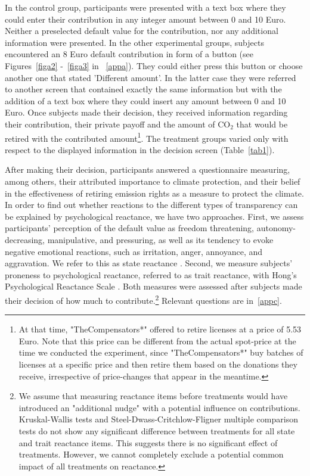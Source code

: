 \documentclass[review, authoryear,12pt]{elsarticle}
\begin{document}
In the control group, participants were presented with a text box where they could enter their contribution in any integer amount between 0 and 10 Euro. Neither a preselected default value for the contribution, nor any additional information were presented. In the other experimental groups, subjects encountered an 8 Euro default contribution in form of a button (see Figures~\ref{figa2} -~\ref{figa3} in ~\ref{appa}). They could either press this button or choose another one that stated 'Different amount'. In the latter case they were referred to another screen that contained exactly the same information but with the addition of a text box where they could insert any amount between 0 and 10 Euro. Once subjects made their decision, they received information regarding their contribution, their private payoff and the amount of CO$_2$ that would be retired with the contributed amount\footnote{At that time, "TheCompensators*" offered to retire licenses at a price of 5.53 Euro. Note that this price can be different from the actual spot-price at the time we conducted the experiment, since "TheCompensators*" buy batches of licenses at a specific price and then retire them based on the donations they receive, irrespective of price-changes that appear in the meantime.}. The treatment groups varied only with respect to the displayed information in the decision screen (Table~\ref{tab1}).

After making their decision, participants answered a questionnaire measuring, among others, their attributed importance to climate protection, and their belief in the effectiveness of retiring emission rights as a measure to protect the climate. In order to find out whether reactions to the different types of transparency can be explained by psychological reactance, we have two approaches. First, we assess participants' perception of the default value as freedom threatening, autonomy-decreasing, manipulative, and pressuring, as well as its tendency to evoke negative emotional reactions, such as irritation, anger, annoyance, and aggravation. We refer to this as state reactance \citep{Dillard.2005}. Second, we measure subjects' proneness to psychological reactance, referred to as trait reactance, with Hong's Psychological Reactance Scale \citep{Hong.1996}. Both measures were assessed after subjects made their decision of how much to contribute.\footnote{We assume that measuring reactance items before treatments would have introduced an "additional nudge" with a potential influence on contributions. Kruskal-Wallis tests and Steel-Dwass-Critchlow-Fligner multiple comparison tests do not show any significant difference between treatments for all state and trait reactance items. This suggests there is no significant effect of treatments. However, we cannot completely exclude a potential common impact of all treatments on reactance.} Relevant questions are in~\ref{appc}.
\end{document}
